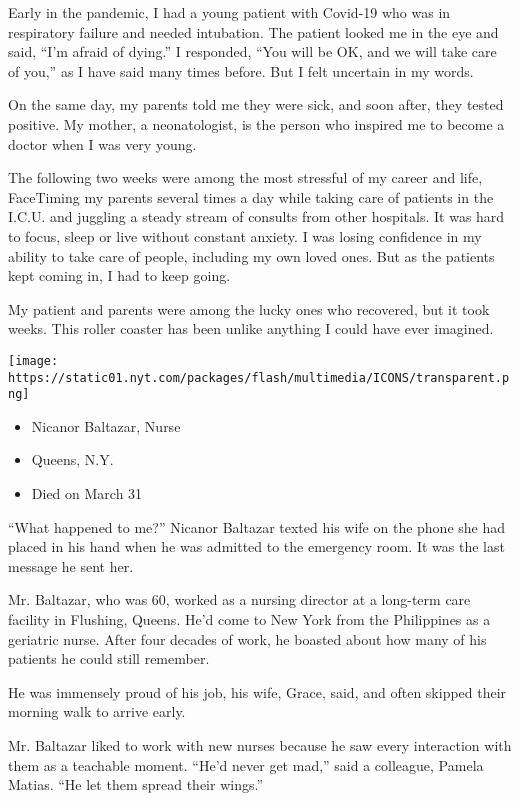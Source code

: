 Early in the pandemic, I had a young patient with Covid-19 who was in
respiratory failure and needed intubation. The patient looked me in the
eye and said, ``I'm afraid of dying.'' I responded, ``You will be OK,
and we will take care of you,'' as I have said many times before. But I
felt uncertain in my words.

On the same day, my parents told me they were sick, and soon after, they
tested positive. My mother, a neonatologist, is the person who inspired
me to become a doctor when I was very young.

The following two weeks were among the most stressful of my career and
life, FaceTiming my parents several times a day while taking care of
patients in the I.C.U. and juggling a steady stream of consults from
other hospitals. It was hard to focus, sleep or live without constant
anxiety. I was losing confidence in my ability to take care of people,
including my own loved ones. But as the patients kept coming in, I had
to keep going.

My patient and parents were among the lucky ones who recovered, but it
took weeks. This roller coaster has been unlike anything I could have
ever imagined.

\texttt{[image: https://static01.nyt.com/packages/flash/multimedia/ICONS/transparent.png]}

\begin{itemize}
\tightlist
\item
  Nicanor Baltazar, Nurse
\item
  Queens, N.Y.
\item
  Died on March 31
\end{itemize}

``What happened to me?'' Nicanor Baltazar texted his wife on the phone
she had placed in his hand when he was admitted to the emergency room.
It was the last message he sent her.

Mr. Baltazar, who was 60, worked as a nursing director at a long-term
care facility in Flushing, Queens. He'd come to New York from the
Philippines as a geriatric nurse. After four decades of work, he boasted
about how many of his patients he could still remember.

He was immensely proud of his job, his wife, Grace, said, and often
skipped their morning walk to arrive early.

Mr. Baltazar liked to work with new nurses because he saw every
interaction with them as a teachable moment. ``He'd never get mad,''
said a colleague, Pamela Matias. ``He let them spread their wings.''

